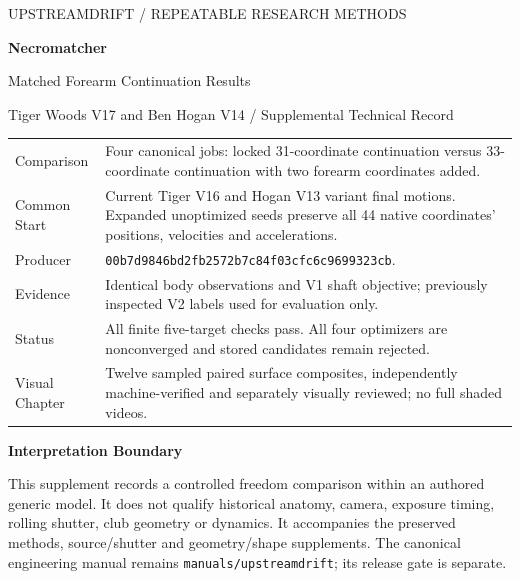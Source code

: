 \documentclass[11pt,letterpaper]{article}
\newcommand{\code}[1]{\nolinkurl{#1}}\newcommand{\hash}[1]{{\footnotesize\nolinkurl{#1}}}
\begin{document}
\hypersetup{pageanchor=false}
\begin{titlepage}\thispagestyle{empty}\vspace*{0.55in}
{\large\textcolor{accent}{UPSTREAMDRIFT / REPEATABLE RESEARCH METHODS}}\par\vspace{.25in}
{\Huge\bfseries\textcolor{ink}{Necromatcher}}\par\vspace{.18in}
{\LARGE Matched Forearm Continuation Results}\par\vspace{.3in}
{\large Tiger Woods V17 and Ben Hogan V14 / Supplemental Technical Record}\par\vspace{.35in}
\par\smallskip
\begin{tabular}{@{}p{1.35in}p{4.6in}@{}}\toprule
Comparison & Four canonical jobs: locked 31-coordinate continuation versus 33-coordinate continuation with two forearm coordinates added.\\
Common Start & Current Tiger V16 and Hogan V13 variant final motions. Expanded unoptimized seeds preserve all 44 native coordinates' positions, velocities and accelerations.\\
Producer & \hash{00b7d9846bd2fb2572b7c84f03cfc6c9699323cb}.\\
Evidence & Identical body observations and V1 shaft objective; previously inspected V2 labels used for evaluation only.\\
Status & All finite five-target checks pass. All four optimizers are nonconverged and stored candidates remain rejected.\\
Visual Chapter & Twelve sampled paired surface composites, independently machine-verified and separately visually reviewed; no full shaded videos.\\\bottomrule
\end{tabular}\par\smallskip
\vfill\textcolor{ink}{\textbf{Interpretation Boundary}}\par
This supplement records a controlled freedom comparison within an authored generic model.
It does not qualify historical anatomy, camera, exposure timing, rolling shutter, club geometry or dynamics.
It accompanies the preserved methods, source/shutter and geometry/shape supplements.
The canonical engineering manual remains \code{manuals/upstreamdrift}; its release gate is separate.
\end{titlepage}\hypersetup{pageanchor=true}
\end{document}
